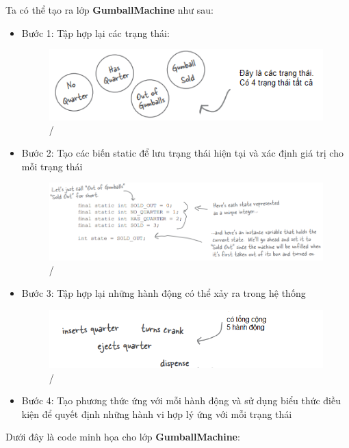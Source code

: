 Ta có thể tạo ra lớp \textbf{GumballMachine} như sau:
\begin{itemize}
\item Bước 1: Tập hợp lại các trạng thái:
    \begin{figure}[!htb]
    \centering
    \includegraphics[width=\textwidth]{fig/State/GumballState.png}/
    \end{figure}
\item Bước 2: Tạo các biến static để lưu trạng thái hiện tại và xác định giá trị cho mỗi trạng thái
    \begin{figure}[!htb]
    \centering
    \includegraphics[width=\textwidth]{fig/State/Gumballs_388B2.png}/
    \end{figure}
\item Bước 3: Tập hợp lại những hành động có thể xảy ra trong hệ thống
    \begin{figure}[!htb]
    \centering
    \includegraphics[width=\textwidth]{fig/State/Gumballs_388B3.png}/
    \end{figure}
\item Bước 4: Tạo phương thức ứng với mỗi hành động và sử dụng biểu thức điều kiện để quyết định những hành vi hợp lý ứng với mỗi trạng thái 
\end{itemize}

Dưới đây là code minh họa cho lớp \textbf{GumballMachine}:\newpage

